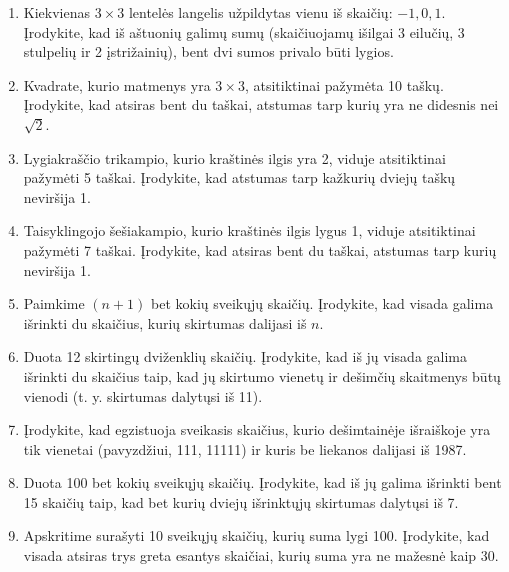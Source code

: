 \documentclass[11pt,a4paper]{scrartcl}
\begin{document}
\begin{enumerate}
    \item Kiekvienas $3\times3$ lentelės langelis užpildytas vienu iš skaičių: $-1, 0, 1$. Įrodykite, kad iš aštuonių galimų sumų (skaičiuojamų išilgai 3 eilučių, 3 stulpelių ir 2 įstrižainių), bent dvi sumos privalo būti lygios.
    \item Kvadrate, kurio matmenys yra $3 \times 3$, atsitiktinai pažymėta 10 taškų. Įrodykite, kad atsiras bent du taškai, atstumas tarp kurių yra ne didesnis nei $\sqrt{2}$.
\begin{center}
\end{center}
    \item Lygiakraščio trikampio, kurio kraštinės ilgis yra 2, viduje atsitiktinai pažymėti 5 taškai. Įrodykite, kad atstumas tarp kažkurių dviejų taškų neviršija 1.
\begin{center}
\end{center}
    \item Taisyklingojo šešiakampio, kurio kraštinės ilgis lygus 1, viduje atsitiktinai pažymėti 7 taškai. Įrodykite, kad atsiras bent du taškai, atstumas tarp kurių neviršija 1.
    \item Paimkime $(n+1)$ bet kokių sveikųjų skaičių. Įrodykite, kad visada galima išrinkti du skaičius, kurių skirtumas dalijasi iš $n$.
    \item Duota 12 skirtingų dviženklių skaičių. Įrodykite, kad iš jų visada galima išrinkti du skaičius taip, kad jų skirtumo vienetų ir dešimčių skaitmenys būtų vienodi (t. y. skirtumas dalytųsi iš 11).
    \item Įrodykite, kad egzistuoja sveikasis skaičius, kurio dešimtainėje išraiškoje yra tik vienetai (pavyzdžiui, 111, 11111) ir kuris be liekanos dalijasi iš 1987.
    \item Duota 100 bet kokių sveikųjų skaičių. Įrodykite, kad iš jų galima išrinkti bent 15 skaičių taip, kad bet kurių dviejų išrinktųjų skirtumas dalytųsi iš 7.
    \item Apskritime surašyti 10 sveikųjų skaičių, kurių suma lygi 100. Įrodykite, kad visada atsiras trys greta esantys skaičiai, kurių suma yra ne mažesnė kaip 30.

\end{enumerate}
\end{document}
